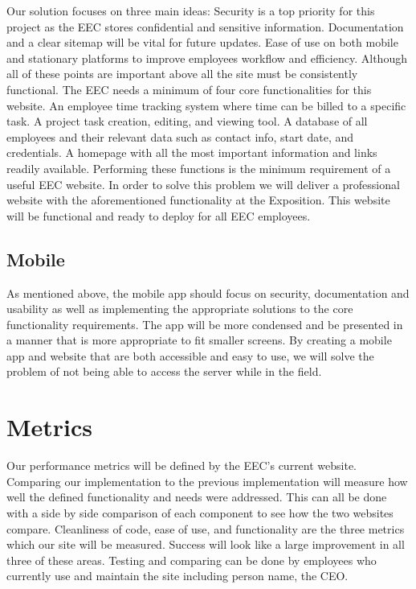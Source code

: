 \documentclass[letterpaper,10pt,titlepage,draftclsnofoot,onecolumn]{IEEEtran}
\begin{document}
Our solution focuses on three main ideas: Security is a top priority for this project as the EEC stores confidential and sensitive information. Documentation and a clear sitemap will be vital for future updates. Ease of use on both mobile and stationary platforms to improve employees workflow and efficiency. Although all of these points are important above all the site must be consistently functional.\newline
The EEC needs a minimum of four core functionalities for this website. An employee time tracking system where time can be billed to a specific task. A project task creation, editing, and viewing tool. A database of all employees and their relevant data such as contact info, start date, and credentials. A homepage with all the most important information and links readily available. Performing these functions is the minimum requirement of a useful EEC website.\newline
In order to solve this problem we will deliver a professional website with the aforementioned functionality at the Exposition. This website will be functional and ready to deploy for all EEC employees.

\subsection{Mobile}

As mentioned above, the mobile app should focus on security, documentation and usability as well as implementing the appropriate solutions to the core functionality requirements. The app will be more condensed and be presented in a manner that is more appropriate to fit smaller screens. By creating a mobile app and website that are both accessible and easy to use, we will solve the problem of not being able to access the server while in the field. 


\section{Metrics}

Our performance metrics will be defined by the EEC’s current website. Comparing our implementation to the previous implementation will measure how well the defined functionality and needs were addressed. This can all be done with a side by side comparison of each component to see how the two websites compare. Cleanliness of code, ease of use, and functionality are the three metrics which our site will be measured. Success will look like a large improvement in all three of these areas. Testing and comparing can be done by employees who currently use and maintain the site including person name, the CEO. 
\end{document}
